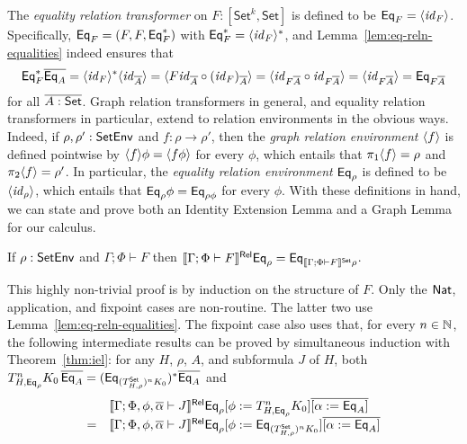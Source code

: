 \documentclass[runningheads]{llncs}
\newcommand{\set}{\mathsf{Set}}
\renewcommand{\id}{\mathit{id}}
\renewcommand{\id}{\mathit{id}}
\begin{document}
The {\em equality relation transformer} on $F : [\set^k,\set]$ is
defined to be $\Eq_F = \graph{\id_{F}}$. Specifically, $\mathsf{Eq}_F = (F, F,
\mathsf{Eq}_F^*)$ with $\Eq_F^* = \graph{\id_{F}}^*$, and
Lemma~\ref{lem:eq-reln-equalities} indeed ensures that
\begin{equation}\label{eq:eq-pres-eq}
\Eq^*_F \ol{\Eq_A}
= \graph{\id_F}^* \graph{\id_{\ol{A}}}
= \graph{F \id_{\ol{A}} \circ (\id_F)_{\ol{A}}}
= \graph{\id_{F\ol{A}} \circ \id_{F\ol{A}}}
= \graph{\id_{F\ol{A}}}
= \Eq_{F\ol{A}}
\end{equation}
for all $\ol{A : \set}$. Graph relation transformers in general, and
equality relation transformers in particular, extend to relation
environments in the obvious ways. Indeed, if $\rho, \rho' : \mathsf{SetEnv}$
and $f : \rho \to \rho'$, then the {\em graph relation environment}
$\langle {f} \rangle$ is defined pointwise by $\langle {f} \rangle \phi = \langle {f \phi} \rangle$
for every $\phi$, which entails that $\pi_1 \langle {f} \rangle = \rho$ and
$\pi_2 \langle {f} \rangle = \rho'$. In particular, the {\em equality relation
  environment} $\mathsf{Eq}_\rho$ is defined to be $\graph{\id_{\rho}}$, which
entails that $\mathsf{Eq}_\rho \phi = \mathsf{Eq}_{\rho \phi}$ for every $\phi$.  With
these definitions in hand, we can state and prove both an Identity
Extension Lemma and a Graph Lemma for our calculus.
\begin{theorem}[IEL]\label{thm:iel}
  If $\rho : \mathsf{SetEnv}$ and $\Gamma; \Phi \vdash F$ then
  $\relsem{\Gamma; \Phi \vdash F} \Eq_\rho = \Eq_{\setsem{\Gamma;
      \Phi \vdash F}\rho}$.
\end{theorem}
This highly non-trivial proof is by induction on the structure of
$F$. Only the $\mathsf{Nat}$, application, and fixpoint cases are
non-routine. The latter two use
Lemma~\ref{lem:eq-reln-equalities}. The fixpoint case also uses that,
for every $n \in \mathbb{N}$, the following intermediate results can be
proved by simultaneous induction with Theorem~\ref{thm:iel}: for any
$H$, $\rho$, $A$, and subformula $J$ of $H$, both
$T^n_{H,\Eq_{\rho}} K_0\, \ol{\Eq_A}
= (\Eq_{(T^\set_{H,\rho})^n K_0})^*
\ol{\Eq_A}$\;
and\;
\[\begin{array}{ll}
&  \relsem{\Gamma; \Phi, \phi, \ol{\alpha} \vdash J} \Eq_{\rho} [\phi
  := T^{n}_{H,\Eq_{\rho}} K_0] \overline{[\alpha := \Eq_A]}\\
=  &
\relsem{\Gamma; \Phi, \phi,
  \ol{\alpha} \vdash J} \Eq_{\rho} [\phi := \Eq_{(T^\set_{H,\rho})^n K_0}]
\overline{[\alpha := \Eq_A]}
\end{array}\]
\end{document}

